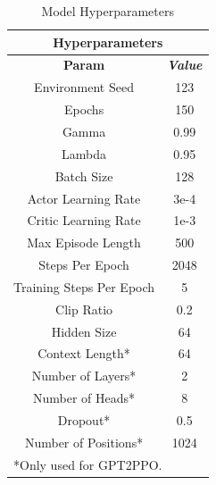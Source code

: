 \documentclass[conference]{IEEEtran}
\begin{document}
\begin{table}[htbp]
    \caption{Model Hyperparameters}
    \begin{center}
        \begin{tabular}{|c|c|}
            \hline
            \multicolumn{2}{|c|}{\textbf{Hyperparameters}}     \\
            \hline
            \textbf{Param}           & \textbf{\textit{Value}} \\
            \hline
            Environment Seed         & 123                     \\
            Epochs                   & 150                     \\
            Gamma                    & 0.99                    \\
            Lambda                   & 0.95                    \\
            Batch Size               & 128                     \\
            Actor Learning Rate      & 3e-4                    \\
            Critic Learning Rate     & 1e-3                    \\
            Max Episode Length       & 500                     \\
            Steps Per Epoch          & 2048                    \\
            Training Steps Per Epoch & 5                       \\
            Clip Ratio               & 0.2                     \\
            Hidden Size              & 64                      \\
            Context Length*          & 64                      \\
            Number of Layers*        & 2                       \\
            Number of Heads*         & 8                       \\
            Dropout*                 & 0.5                     \\
            Number of Positions*     & 1024                    \\
            \hline
            \multicolumn{2}{l}{*Only used for GPT2PPO.}
        \end{tabular}
        \label{tab:hyperparameters}
    \end{center}
\end{table}
\end{document}
